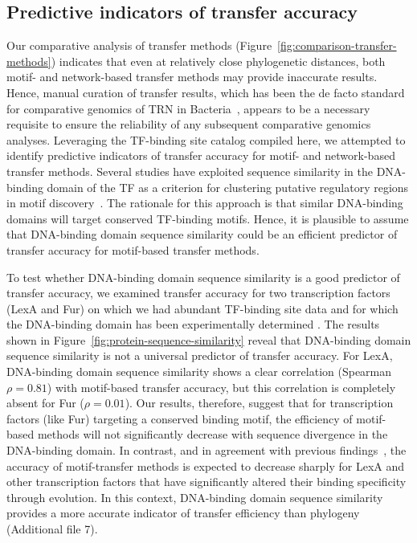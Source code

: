 \subsection{Predictive indicators of transfer accuracy}

Our comparative analysis of transfer methods
(Figure~\ref{fig:comparison-transfer-methods}) indicates that even at
relatively close phylogenetic distances, both motif- and network-based transfer
methods may provide inaccurate results. Hence, manual curation of transfer
results, which has been the de facto standard for comparative genomics of TRN
in Bacteria~\cite{tan2001comparative, erill2004differences,
  gelfand2000comparative, novichkov2010regpredict}, appears to be a necessary
requisite to ensure the reliability of any subsequent comparative genomics
analyses. Leveraging the TF-binding site catalog compiled here, we attempted to
identify predictive indicators of transfer accuracy for motif- and
network-based transfer methods. Several studies have exploited sequence
similarity in the DNA-binding domain of the TF as a criterion for clustering
putative regulatory regions in motif discovery~\cite{francke2008generic,
  ravcheev2014comparative, dufour2010reconstruction, sahota2010novel}. The
rationale for this approach is that similar DNA-binding domains will target
conserved TF-binding motifs. Hence, it is plausible to assume that DNA-binding
domain sequence similarity could be an efficient predictor of transfer accuracy
for motif-based transfer methods.

To test whether DNA-binding domain sequence similarity is a good predictor of
transfer accuracy, we examined transfer accuracy for two transcription factors
(LexA and Fur) on which we had abundant TF-binding site data and for which the
DNA-binding domain has been experimentally determined
\cite{pohl2003architecture, zhang2010structure}. The results shown in
Figure~\ref{fig:protein-sequence-similarity} reveal that DNA-binding domain
sequence similarity is not a universal predictor of transfer accuracy. For
LexA, DNA-binding domain sequence similarity shows a clear correlation
(Spearman $\rho=0.81$) with motif-based transfer accuracy, but this correlation
is completely absent for Fur ($\rho=0.01$). Our results, therefore, suggest
that for transcription factors (like Fur) targeting a conserved binding motif,
the efficiency of motif-based methods will not significantly decrease with
sequence divergence in the DNA-binding domain. In contrast, and in agreement
with previous findings~\cite{yu2004annotation}, the accuracy of motif-transfer
methods is expected to decrease sharply for LexA and other transcription
factors that have significantly altered their binding specificity through
evolution. In this context, DNA-binding domain sequence similarity provides a
more accurate indicator of transfer efficiency than phylogeny (Additional file
7).

